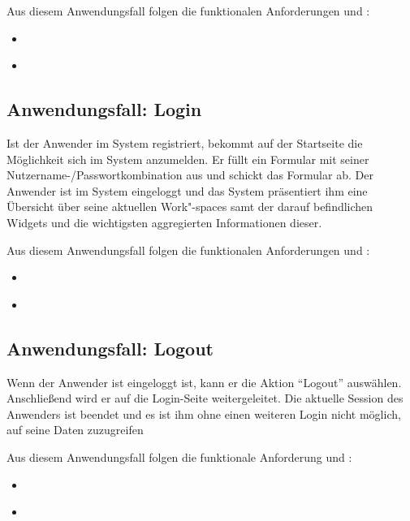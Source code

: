 Aus diesem Anwendungsfall folgen die funktionalen Anforderungen  und :\\
\begin{itemize}
 \item \requirementf{\requirementRegistrieren}\label{requirementRegistrieren}
 \item \requirementf{\requirementUniqueLoginEmail}\label{requirementUniqueLoginEmail}
\end{itemize}
 
\subsection{Anwendungsfall: Login}
Ist der Anwender im System registriert, bekommt auf der Startseite die Möglichkeit sich im System anzumelden. Er füllt ein Formular mit seiner Nutzername-/Passwortkombination aus und schickt das Formular ab. Der Anwender ist im System eingeloggt und das System präsentiert ihm eine Übersicht über seine aktuellen Work"-spaces samt der darauf befindlichen Widgets und die wichtigsten aggregierten Informationen dieser.
 
Aus diesem Anwendungsfall folgen die funktionalen Anforderungen  und :
\begin{itemize}
 \item \requirementf{\requirementLogin}\label{requirementLogin}
 \item \requirementf{\requirementZugriffAufEigeneWidgets}\label{requirementZugriffAufEigeneWidgets}
\end{itemize}

\subsection{Anwendungsfall: Logout}
Wenn der Anwender ist eingeloggt ist, kann er die Aktion "`Logout"' auswählen. Anschließend wird er auf die Login-Seite weitergeleitet. Die aktuelle Session des Anwenders ist beendet und es ist ihm ohne einen weiteren Login nicht möglich, auf seine Daten zuzugreifen 
 
Aus diesem Anwendungsfall folgen die funktionale Anforderung  und :
\begin{itemize}
 \item \requirementf{\requirementLogout}\label{requirementLogout}
 \item \requirementf{\requirementKeinZugriffNachLogout}\label{requirementKeinZugriffNachLogout}
\end{itemize}

